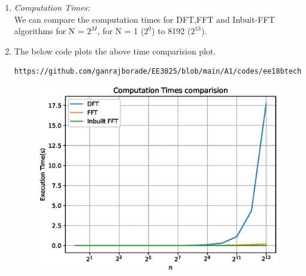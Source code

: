 \documentclass[journal,12pt,twocolumn]{IEEEtran}
\renewcommand\thesection{\arabic{section}}
\begin{document}
\begin{enumerate}[label=\thesection.\arabic*.,ref=\thesection.\theenumi]
\item \emph{Computation Times:} \\
We can compare the computation times for DFT,FFT and Inbuit-FFT algorithms for N = $2^{M}$, for N = 1 ($2^{0}$) to 8192 ($2^{13}$).
\item The below code plots the above time comparision plot.
\begin{lstlisting}
https://github.com/ganrajborade/EE3025/blob/main/A1/codes/ee18btech11016_2.py
\end{lstlisting}
\begin{figure}[!ht]
	\includegraphics[width=1.15\columnwidth]{./figs/EE18BTECH11016_2.eps}
\end{figure}


\end{enumerate}
\end{document}
